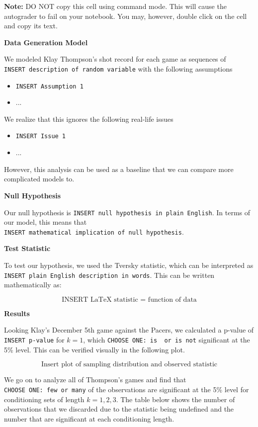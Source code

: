 \documentclass[11pt]{article}
\providecommand{\tightlist}{%
      \setlength{\itemsep}{0pt}\setlength{\parskip}{0pt}}
\begin{document}
\textbf{Note:} DO NOT copy this cell using command mode. This will cause
the autograder to fail on your notebook. You may, however, double click
on the cell and copy its text.

\textbf{Data Generation Model}

We modeled Klay Thompson's shot record for each game as sequences of
\texttt{INSERT\ description\ of\ random\ variable} with the following
assumptions

\begin{itemize}
\tightlist
\item
  \texttt{INSERT\ Assumption\ 1}
\item
  ...
\end{itemize}

We realize that this ignores the following real-life issues

\begin{itemize}
\tightlist
\item
  \texttt{INSERT\ Issue\ 1}
\item
  ...
\end{itemize}

However, this analysis can be used as a baseline that we can compare
more complicated models to.

\textbf{Null Hypothesis}

Our null hypothesis is
\texttt{INSERT\ null\ hypothesis\ in\ plain\ English}. In terms of our
model, this means that
\texttt{INSERT\ mathematical\ implication\ of\ null\ hypothesis}.

\textbf{Test Statistic}

To test our hypothesis, we used the Tversky statistic, which can be
interpreted as \texttt{INSERT\ plain\ English\ description\ in\ words}.
This can be written mathematically as:

\[\text{INSERT LaTeX statistic = function of data}\]

\textbf{Results}

Looking Klay's December 5th game against the Pacers, we calculated a
p-value of \texttt{INSERT\ p-value} for \(k=1\), which
\texttt{CHOOSE\ ONE:\ is\ \ or\ is\ not} significant at the 5\% level.
This can be verified visually in the following plot.

\[\text{Insert plot of sampling distribution and observed statistic}\]

We go on to analyze all of Thompson's games and find that
\texttt{CHOOSE\ ONE:\ few\ or\ many} of the observations are significant
at the 5\% level for conditioning sets of length \(k=1,2,3\). The table
below shows the number of observations that we discarded due to the
statistic being undefined and the number that are significant at each
conditioning length.
\end{document}

